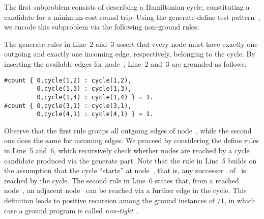 The first subproblem consists of describing a Hamiltonian cycle,
constituting a candidate for a minimum-cost round trip.
Using the generate-define-test pattern~\cite{lifschitz02a},
we encode this subproblem via the following non-ground rules:
%

%
The generate rules in Line~2 and~3 assert that every node must have
exactly one outgoing and exactly one incoming edge, respectively,
belonging to the cycle.
By inserting the available edges for node~,
Line~2 and~3 are grounded as follows:%
%
\begin{lstlisting}[numbers=none]
#count { 0,cycle(1,2) : cycle(1,2),
         0,cycle(1,3) : cycle(1,3),
         0,cycle(1,4) : cycle(1,4) } = 1.
#count { 0,cycle(3,1) : cycle(3,1), 
         0,cycle(4,1) : cycle(4,1) } = 1.
\end{lstlisting}
%
Observe that the first rule groups all outgoing edges of node~,
while the second one does the same for incoming edges.
We proceed by considering the define rules in Line~5 and~6,
which recursively check whether nodes are reached by a cycle candidate
produced via the generate part.
Note that the rule in Line~5 builds on the assumption that the cycle
``starts'' at node~, that is,
any successor~ of~ is reached by the cycle.
The second rule in Line~6 states that, from a reached node~,
an adjacent node~ can be reached via a further edge in the cycle.
This definition leads to positive recursion
among the ground instances of /$1$,
in which case a ground program is called \emph{non-tight}~\cite{erdlif03a,fages94a}.
